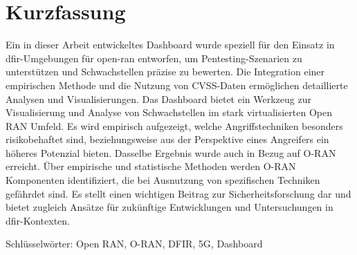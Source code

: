 \chapter*{Kurzfassung}
\label{chap:kurzfassung}
Ein in dieser Arbeit entwickeltes Dashboard wurde speziell für den Einsatz in \gls{dfir}-Umgebungen für \gls{open-ran} entworfen, um Pentesting-Szenarien zu unterstützen und Schwachstellen präzise zu bewerten. Die Integration einer empirischen Methode und die Nutzung von CVSS-Daten ermöglichen detaillierte Analysen und Visualisierungen. Das Dashboard bietet ein Werkzeug zur Visualisierung und Analyse von Schwachstellen im stark virtualisierten Open RAN Umfeld. Es wird empirisch aufgezeigt, welche Angriffstechniken besonders risikobehaftet sind, beziehungsweise aus der Perspektive eines Angreifers ein höheres Potenzial bieten. Dasselbe Ergebnis wurde auch in Bezug auf O-RAN erreicht. Über empirische und statistische Methoden werden O-RAN Komponenten identifiziert, die bei Ausnutzung von spezifischen Techniken gefährdet sind. Es stellt einen wichtigen Beitrag zur Sicherheitsforschung dar und bietet zugleich Ansätze für zukünftige Entwicklungen und Untersuchungen in \gls{dfir}-Kontexten.
\par Schlüsselwörter: Open RAN, O-RAN, DFIR, 5G, Dashboard

